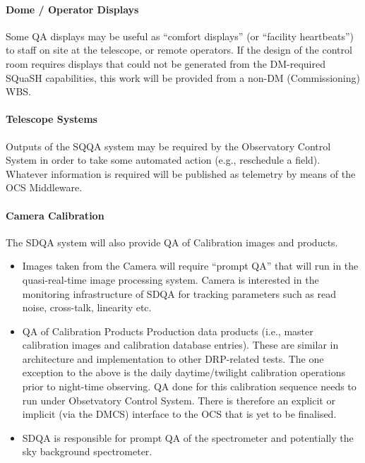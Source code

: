 \paragraph{Dome / Operator Displays}
\label{sec:qaDomeDisplay}

Some QA displays may be useful as ``comfort displays'' (or ``facility heartbeats'') to staff on site at the telescope, or remote operators. If the design of the control room requires displays that could not be generated from the DM-required SQuaSH capabilities, this work will be provided from a non-DM (Commissioning) WBS.

\paragraph{Telescope Systems}
\label{sec:qaTelescopeSystem}

Outputs of the SQQA system may be required by the Observatory Control System in order to take some automated action (e.g., reschedule a field). Whatever information is required will be published as telemetry by means of the OCS Middleware.

\paragraph{Camera Calibration}
\label{sec:qaCameraCalibration}

The SDQA system will also provide QA of Calibration images and products.

\begin{itemize}

\item Images taken from the Camera will require ``prompt QA'' that will run in the quasi-real-time image processing system. Camera is interested in the monitoring infrastructure of SDQA for tracking parameters such as read noise, cross-talk, linearity etc.

\item QA of Calibration Products Production data products (i.e., master calibration images and calibration database entries). These are similar in architecture and implementation to other DRP-related tests. The one exception to the above is the daily daytime/twilight calibration operations prior to night-time observing. QA done for this calibration sequence needs to run under Obsetvatory Control System. There is therefore an explicit or implicit (via the DMCS) interface to the OCS that is yet to be finalised.

\item SDQA is responsible for prompt QA of the spectrometer and potentially the sky background spectrometer.

\end{itemize}

